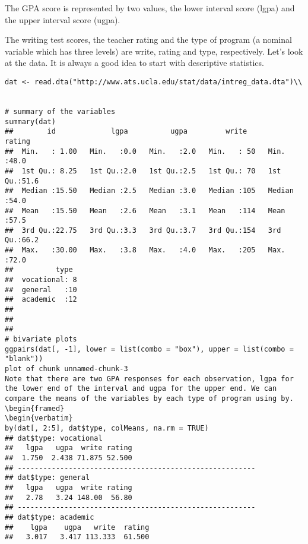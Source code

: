 \documentclass[a4paper,12pt]{article}
\begin{document}
The GPA score is represented by two values, the lower interval score (lgpa) and the upper interval score (ugpa). 

The writing test scores, the teacher rating and the type of program (a nominal variable which has three levels) are write, rating and type, respectively. Let's look at the data. It is always a good idea to start with descriptive statistics.


\begin{framed}
\begin{verbatim}
dat <- read.dta("http://www.ats.ucla.edu/stat/data/intreg_data.dta")\\


# summary of the variables
summary(dat)
##        id             lgpa          ugpa         write         rating    
##  Min.   : 1.00   Min.   :0.0   Min.   :2.0   Min.   : 50   Min.   :48.0  
##  1st Qu.: 8.25   1st Qu.:2.0   1st Qu.:2.5   1st Qu.: 70   1st Qu.:51.6  
##  Median :15.50   Median :2.5   Median :3.0   Median :105   Median :54.0  
##  Mean   :15.50   Mean   :2.6   Mean   :3.1   Mean   :114   Mean   :57.5  
##  3rd Qu.:22.75   3rd Qu.:3.3   3rd Qu.:3.7   3rd Qu.:154   3rd Qu.:66.2  
##  Max.   :30.00   Max.   :3.8   Max.   :4.0   Max.   :205   Max.   :72.0  
##          type   
##  vocational: 8  
##  general   :10  
##  academic  :12  
##                 
##                 
## 
# bivariate plots
ggpairs(dat[, -1], lower = list(combo = "box"), upper = list(combo = "blank"))
plot of chunk unnamed-chunk-3
Note that there are two GPA responses for each observation, lgpa for the lower end of the interval and ugpa for the upper end. We can compare the means of the variables by each type of program using by.
\begin{framed}
\begin{verbatim}
by(dat[, 2:5], dat$type, colMeans, na.rm = TRUE)
## dat$type: vocational
##   lgpa   ugpa  write rating 
##  1.750  2.438 71.875 52.500 
## -------------------------------------------------------- 
## dat$type: general
##   lgpa   ugpa  write rating 
##   2.78   3.24 148.00  56.80 
## -------------------------------------------------------- 
## dat$type: academic
##    lgpa    ugpa   write  rating 
##   3.017   3.417 113.333  61.500

\end{verbatim}
\end{framed}

\end{document}
